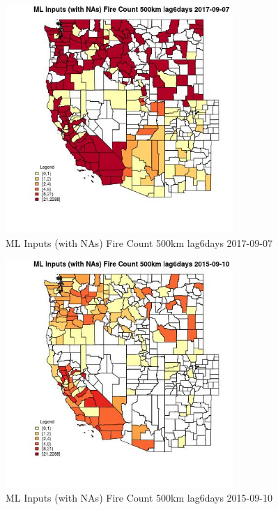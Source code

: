 \begin{figure} 
\centering  
\includegraphics[width=0.77\textwidth]{Code_Outputs/Report_ML_input_PM25_Step4_part_e_de_duplicated_aves_compiled_2019-05-21wNAs_CountyFire_Count_500km_lag6daysMean2017-09-07.jpg} 
\caption{\label{fig:Report_ML_input_PM25_Step4_part_e_de_duplicated_aves_compiled_2019-05-21wNAsCountyFire_Count_500km_lag6daysMean2017-09-07}ML Inputs (with NAs) Fire Count 500km lag6days 2017-09-07} 
\end{figure} 
 

\begin{figure} 
\centering  
\includegraphics[width=0.77\textwidth]{Code_Outputs/Report_ML_input_PM25_Step4_part_e_de_duplicated_aves_compiled_2019-05-21wNAs_CountyFire_Count_500km_lag6daysMean2015-09-10.jpg} 
\caption{\label{fig:Report_ML_input_PM25_Step4_part_e_de_duplicated_aves_compiled_2019-05-21wNAsCountyFire_Count_500km_lag6daysMean2015-09-10}ML Inputs (with NAs) Fire Count 500km lag6days 2015-09-10} 
\end{figure} 
 

